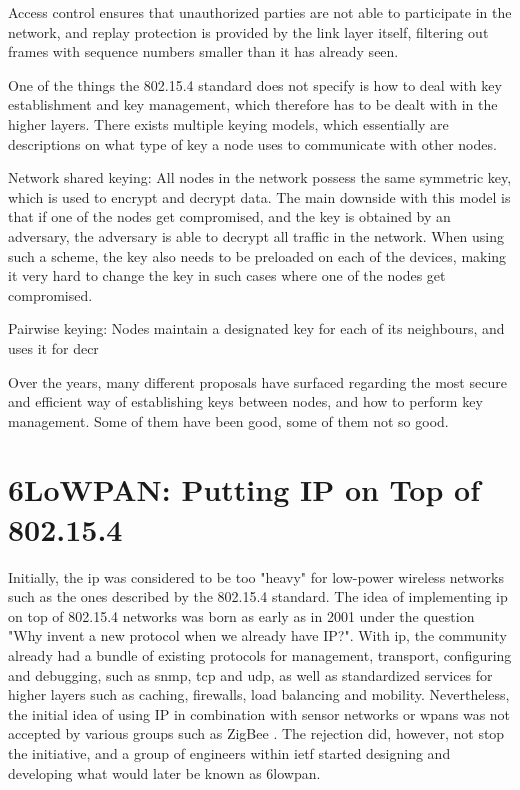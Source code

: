 Access control ensures that unauthorized parties are not able to participate in the network, and replay protection is provided by the link layer itself, filtering out frames with sequence numbers smaller than it has already seen.

One of the things the 802.15.4 standard does not specify is how to deal with key establishment and key management, which therefore has to be dealt with in the higher layers. There exists multiple keying models, which essentially are descriptions on what type of key a node uses to communicate with other nodes.


Network shared keying: All nodes in the network possess the same symmetric key, which is used to encrypt and decrypt data. The main downside with this model is that if one of the nodes get compromised, and the key is obtained by an adversary, the adversary is able to decrypt all traffic in the network. When using such a scheme, the key also needs to be preloaded on each of the devices, making it very hard to change the key in such cases where one of the nodes get compromised. 


Pairwise keying: Nodes maintain a designated key for each of its neighbours, and uses it for decr




Over the years, many different proposals have surfaced regarding the most secure and efficient way of establishing keys between nodes, and how to perform key management. Some of them have been good, some of them not so good.


\section{6LoWPAN: Putting IP on Top of 802.15.4}


Initially, the \gls{ip} was considered to be too "heavy" for low-power wireless networks such as the ones described by the 802.15.4 standard. The idea of implementing \gls{ip} on top of 802.15.4 networks was born as early as in 2001 under the question "Why invent a new protocol when we already have IP?"\cite{Mulligan2007}. With \gls{ip}, the community already had a bundle of existing protocols for management, transport, configuring and debugging, such as \gls{snmp}, \gls{tcp} and \gls{udp}, as well as standardized services for higher layers such as caching, firewalls, load balancing and mobility. Nevertheless, the initial idea of using IP in combination with sensor networks or \gls{wpan}s was not accepted by various groups such as ZigBee \cite{Mulligan2007}. The rejection did, however, not stop the initiative, and a group of engineers within \gls{ietf} started designing and developing what would later be known as \gls{6lowpan}.

